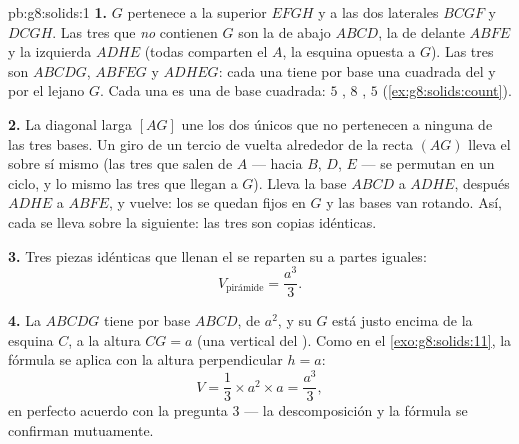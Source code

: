 \begin{solution}{pb:g8:solids:1}
\textbf{1.} $G$ pertenece a la  superior $EFGH$ y a las dos
 laterales $BCGF$ y $DCGH$. Las tres  que \emph{no}
contienen $G$ son la de abajo $ABCD$, la de delante $ABFE$ y la
 izquierda $ADHE$ (todas comparten el  $A$, la esquina
opuesta a $G$). Las tres  son $ABCDG$, $ABFEG$ y
$ADHEG$: cada una tiene por base una  cuadrada del  y por 
el  lejano $G$. Cada una es una  de base cuadrada: $5$ ,
$8$ , $5$  (\cref{ex:g8:solids:count}).

\textbf{2.} La diagonal larga $[AG]$ une los dos únicos 
que no pertenecen a ninguna de las tres bases. Un giro de un tercio de vuelta
alrededor de la recta $(AG)$ lleva el  sobre sí mismo (las tres 
que salen de $A$ --- hacia $B$, $D$, $E$ --- se permutan en un
ciclo, y lo mismo las tres  que llegan a $G$). Lleva
la base $ABCD$ a $ADHE$, después $ADHE$ a $ABFE$, y vuelve:
los  se quedan fijos en $G$ y las bases van rotando. Así, cada  se lleva
sobre la siguiente: las tres son copias idénticas.

\textbf{3.} Tres piezas idénticas que llenan el  se reparten su
 a partes iguales:
\[
V_{\text{pirámide}} = \frac{a^3}{3} .
\]

\textbf{4.} La  $ABCDG$ tiene por base $ABCD$, de  $a^2$,
y su  $G$ está justo encima de la esquina $C$, a la altura
$CG = a$ (una  vertical del ). Como en el
\cref{exo:g8:solids:11}, la fórmula se aplica con la altura
perpendicular $h = a$:
\[
V = \frac13 \times a^2 \times a = \frac{a^3}{3} ,
\]
en perfecto acuerdo con la pregunta 3 --- la descomposición y
la fórmula se confirman mutuamente.


\end{solution}
